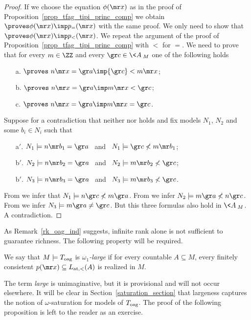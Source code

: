 \begin{proof}
  If we choose the equation $\phi({\mr x})$ as in the proof of Proposition~\ref{prop_tfag_tipi_princ_comp} we obtain $\proves\phi({\mr x})\imp p_{=}({\mr x})$ with the same proof.
  We only need to show that $\proves\phi({\mr x})\imp p_{<}({\mr x})$.
  We repeat the argument of the proof of Proposition~\ref{prop_tfag_tipi_princ_comp} with $<$ for $=$.
  We need to prove that for every $m\in\ZZ$ and every ${\gr c}\in\<A\>_M$ one of the following holds
  \begin{itemize}
  \item[a.] $\proves\   n{\mr x}={\gr a}\imp{\gr c}<m{\mr x}$;
  \item[b.] $\proves\   n{\mr x}={\gr a}\imp m{\mr x}<{\gr c}$;
  \item[c.] $\proves\   n{\mr x}={\gr a}\imp m{\mr x}={\gr c}$.
  \end{itemize}
  Suppose for a contradiction that neither  nor  holds and fix models $N_1$, $N_2$ and some $b_i\in N_i$ such that
  \begin{itemize}
  \item[a$'$.] $N_1\models n{\mr b_1}={\gr a}$ \ and \ $N_1\models {\gr c}\not<m{\mr b_1}$;
  \item[b$'$.] $N_2\models n{\mr b_2}={\gr a}$ \ and \ $N_2\models m{\mr b_2}\not< {\gr c}$;
  \item[b$'$.] $N_3\models n{\mr b_3}={\gr a}$ \ and \ $N_3\models m{\mr b_3}\not< {\gr c}$.
  \end{itemize}
  From  we infer that $N_1\models n{\gr c}\not<m{\gr a}$.
  From  we infer $N_2\models m{\gr a}\not<n{\gr c}$.
  From  we infer $N_3\models m{\gr a}\neq{\gr c}$. 
  But this three formulas also hold in $\<A\>_M$.
  A contradiction.
\end{proof}

As Remark~\ref{rk_oag_ind} suggests, infinite rank alone is not sufficient to guarantee richness.
%
The following property will be required.
\begin{definition}
  We say that $M\models T_{\rm oag}$ is \emph{$\omega_1$-large\/} if for every countable $A\subseteq M$, every finitely consistent $p({\mr x})\subseteq L_{\rm at, <}(A)$ is realized in $M$.\QED
\end{definition}

%
The term \textit{large\/} is unimaginative, but it is provisional and will not occur elsewhere.
%
It will be clear in Section~\ref{saturation_section} that largeness captures the notion of $\omega$-saturation for models of $T_{\rm oag}$. The proof of the following proposition is left to the reader as an exercise.


